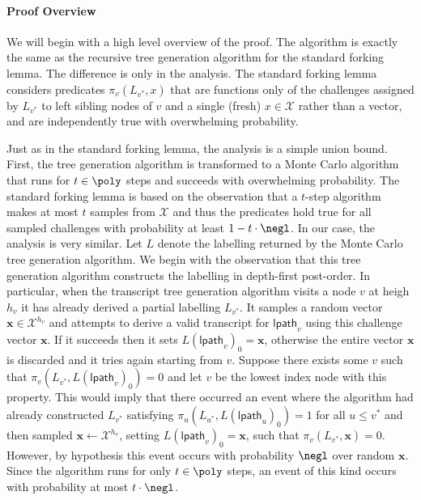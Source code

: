  \paragraph{Proof Overview} 
 We will begin with a high level overview of the proof. The algorithm is exactly the same as the recursive tree generation algorithm for the standard forking lemma. The difference is only in the analysis. The standard forking lemma considers predicates $\pi_v(L_{v^*}, x)$ that are functions only of the challenges assigned by $L_{v^*}$ to left sibling nodes of $v$ and a single (fresh) $x \in \mathcal{X}$ rather than a vector, and are independently true with overwhelming probability. %

Just as in the standard forking lemma, the analysis is a simple union bound. First, the tree generation algorithm is transformed to a Monte Carlo algorithm that runs for $t \in \poly$ steps and succeeds with overwhelming probability. The standard forking lemma is based on the observation that a $t$-step algorithm makes at most $t$ samples from $\mathcal{X}$ and thus the predicates hold true for all sampled challenges with probability at least $1 - t\cdot \negl$. In our case, the analysis is very similar. Let $L$ denote the labelling returned by the Monte Carlo tree generation algorithm. We begin with the observation that this tree generation algorithm constructs the labelling in depth-first post-order. In particular, when the transcript tree generation algorithm visits a node $v$ at heigh $h_v$ it has already derived a partial labelling $L_{v^*}$. It samples a random vector $\mathbf{x} \in \mathcal{X}^{h_v}$ and attempts to derive a valid transcript for $\mathsf{lpath}_v$ using this challenge vector $\mathbf{x}$. If it succeeds then it sets $L(\mathsf{lpath}_v)_0 = \mathbf{x}$, otherwise the entire vector $\mathbf{x}$ is discarded and it tries again starting from $v$. Suppose there exists some $v$ such that $\pi_v(L_{v^*}, L(\mathsf{lpath}_v)_0) = 0$ and let $v$ be the lowest index node with this property.  This would imply that there occurred an event where the algorithm had already constructed $L_{v^*}$ satisfying $\pi_u(L_{u^*}, L(\mathsf{lpath}_u)_0) = 1$ for all $u \leq v^*$ and then sampled $\mathbf{x} \leftarrow \mathcal{X}^{h_v}$, setting $L(\mathsf{lpath}_v)_0 = \mathbf{x}$, such that $\pi_v(L_{v^*}, \mathbf{x}) = 0$. However, by hypothesis this event occurs with probability $\negl$ over random $\mathbf{x}$. Since the algorithm runs for only $t \in \poly$ steps, an event of this kind occurs with probability at most $t \cdot \negl$. 

